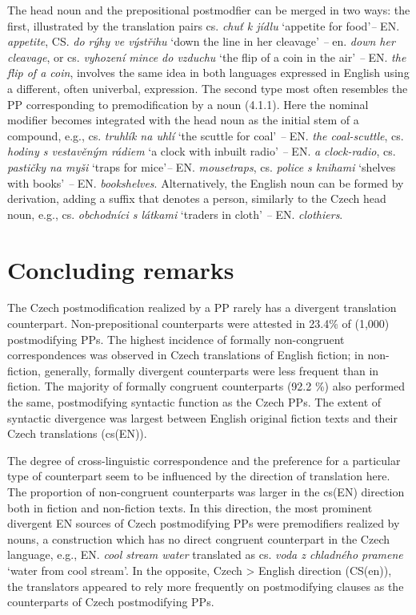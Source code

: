 \documentclass[output=paper]{langscibook}
\begin{document}
The head noun and the prepositional postmodfier can be merged in two ways: the first, illustrated by the translation pairs cs. \textit{chuť k jídlu} ‘appetite for food’\textit{–} EN. \textit{appetite}, CS. \textit{do rýhy ve výstřihu} ‘down the line in her cleavage’ \textit{–} en. \textit{down her cleavage}, or cs. \textit{vyhození mince do vzduchu} ‘the flip of a coin in the air’ \textit{–} EN. \textit{the flip of a coin}, involves the same idea in both languages expressed in English using a different, often univerbal, expression. The second type most often resembles the PP corresponding to premodification by a noun (4.1.1). Here the nominal modifier becomes integrated with the head noun as the initial stem of a compound, e.g., cs. \textit{truhlík na uhlí} ‘the scuttle for coal’ \textit{–} EN. \textit{the coal-scuttle}, cs. \textit{hodiny s vestavěným rádiem} ‘a clock with inbuilt radio’ \textit{–} EN. \textit{a clock-radio}, cs. \textit{pastičky na myši} ‘traps for mice’\textit{–} EN. \textit{mousetraps}, cs. \textit{police s knihami} ‘shelves with books’ \textit{–} EN. \textit{bookshelves}. Alternatively, the English noun can be formed by derivation, adding a suffix that denotes a person, similarly to the Czech head noun, e.g., cs. \textit{obchodníci s látkami} ‘traders in cloth’ \textit{–} EN. \textit{clothiers}.

\section{Concluding remarks}

The Czech postmodification realized by a PP rarely has a divergent translation counterpart. Non-prepositional counterparts were attested in 23.4\% of (1,000) postmodifying PPs. The highest incidence of formally non-congruent correspondences was observed in Czech translations of English fiction; in non-fiction, generally, formally divergent counterparts were less frequent than in fiction. The majority of formally congruent counterparts (92.2 \%) also performed the same, postmodifying syntactic function as the Czech PPs. The extent of syntactic divergence was largest between English original fiction texts and their Czech translations (cs(EN)).

The degree of cross-linguistic correspondence and the preference for a particular type of counterpart seem to be influenced by the direction of translation here. The proportion of non-congruent counterparts was larger in the cs(EN) direction both in fiction and non-fiction texts. In this direction, the most prominent divergent EN sources of Czech postmodifying PPs were premodifiers realized by nouns, a construction which has no direct congruent counterpart in the Czech language, e.g., EN. \textit{cool stream water} translated as cs. \textit{voda z chladného pramene} ‘water from cool stream’. In the opposite, Czech > English direction (CS(en)), the translators appeared to rely more frequently on postmodifying clauses as the counterparts of Czech postmodifying PPs.
\end{document}
